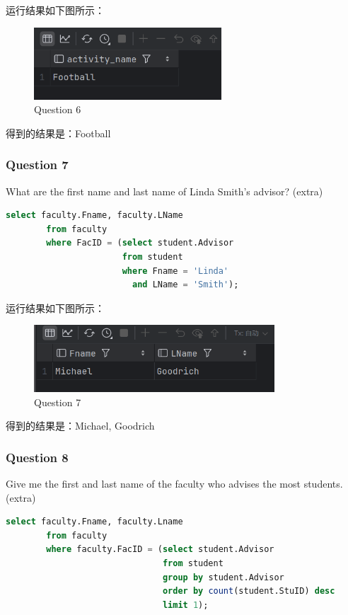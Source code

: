 \documentclass{article}
\begin{document}
    运行结果如下图所示：
    
    \begin{figure}[H]
    	\centering
    	\includegraphics[width=7cm]{./images/9.Question6.png}
    	\caption{Question 6}
    \end{figure}
    
    得到的结果是：Football
    
    \subsubsection{Question 7}
    
    What are the first name and last name of Linda Smith's advisor?  (extra)
    
    \begin{lstlisting}[language=sql, title=Question 7, tabsize=4]
    	select faculty.Fname, faculty.LName
    	from faculty
    	where FacID = (select student.Advisor
    				   from student
    				   where Fname = 'Linda'
    				     and LName = 'Smith');
    \end{lstlisting}
    
    运行结果如下图所示：
    
    \begin{figure}[H]
    	\centering
    	\includegraphics[width=9cm]{./images/10.Question7.png}
    	\caption{Question 7}
    \end{figure}
    
    得到的结果是：Michael, Goodrich
    
    \subsubsection{Question 8}
    
    Give me the first and last name of the faculty who advises the most students.  (extra)
    
    \begin{lstlisting}[language=sql, title=Question 8, tabsize=4]
    	select faculty.Fname, faculty.Lname
    	from faculty
    	where faculty.FacID = (select student.Advisor
    						   from student
    						   group by student.Advisor
    						   order by count(student.StuID) desc
    						   limit 1);
    \end{lstlisting}
    
\end{document}
